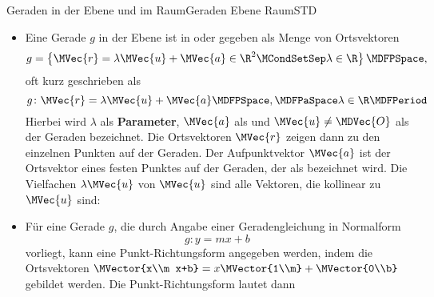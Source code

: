 \begin{MXContent}{Geraden in der Ebene und im Raum}{Geraden Ebene Raum}{STD}
\begin{MInfo}
\begin{itemize}
 \item Eine Gerade $g$ in der Ebene ist in  oder  gegeben als Menge von Ortsvektoren
\[
 g=\left\{\MVec{r}=\lambda\MVec{u}+\MVec{a}\in\R^2\MCondSetSep\lambda\in\R\right\} \MDFPSpace,
\]
oft kurz geschrieben als
\[
 g\colon \MVec{r}=\lambda\MVec{u}+\MVec{a}\MDFPSpace,\MDFPaSpace\lambda\in\R\MDFPeriod
\]
Hierbei wird $\lambda$ als \textbf{Parameter}, $\MVec{a}$ als  und $\MVec{u}\neq\MDVec{O}$ als  der Geraden bezeichnet. Die Ortsvektoren $\MVec{r}$ zeigen dann zu den einzelnen Punkten auf der Geraden. Der Aufpunktvektor $\MVec{a}$ ist der Ortsvektor eines festen Punktes auf der Geraden, der als  bezeichnet wird. Die Vielfachen $\lambda\MVec{u}$ von $\MVec{u}$ sind alle Vektoren, die kollinear zu $\MVec{u}$ sind:
\begin{center}
\end{center}
\item Für eine Gerade $g$, die durch Angabe einer Geradengleichung in Normalform
\[
 g\colon y=m x+b
\]
vorliegt, kann eine Punkt-Richtungsform angegeben werden, indem die Ortsvektoren $\MVector{x\\m x+b}=x\MVector{1\\m}+\MVector{0\\b}$ gebildet werden. Die Punkt-Richtungsform lautet dann 

\end{itemize}
\end{MInfo}
\end{MXContent}
